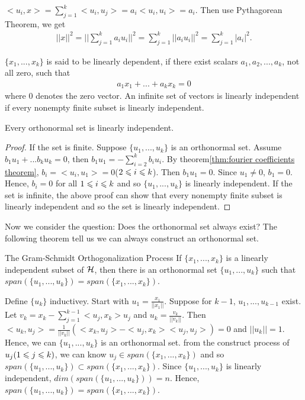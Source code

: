 \begin{proofsolution}
    $<u_i,x>=\sum\limits_{j=1}^{k}<u_i,u_j>=a_i<u_i,u_i>=a_i$. Then use Pythagorean Theorem, we get
    \begin{align*}
        ||x||^2=||\sum\limits_{j=1}^{k} a_iu_i||^2=\sum\limits_{j=1}^{k}||a_iu_i||^2=\sum\limits_{j=1}^{k}|a_i|^2.
    \end{align*}
\end{proofsolution}

\begin{definition}{}{}
    $\{x_1,..., x_k\}$ is said to be linearly dependent, if there exist scalars $a_1,a_2,...,a_k$, not all zero, such that
    \begin{align*}
        a_1x_1+...+a_kx_k=0
    \end{align*}
    where $0$ denotes the zero vector.
    An infinite set of vectors is linearly independent if every nonempty finite subset is linearly independent.
\end{definition}


\begin{corollary}{}{}
    Every orthonormal set is linearly independent.
\end{corollary}
\begin{proof}
    If the set is finite. Suppose $\{u_1,...,u_k\}$ is an orthonormal set. Assume $b_1u_1+...b_ku_k=0$, then $b_1u_1=-\sum\limits_{i=2}^{k}b_iu_i$. 
    By theorem\ref{thm:fourier coefficients theorem}, $b_i=<u_i,u_1>=0$($2\leqslant i\leqslant k$). Then $b_1u_1=0$.
    Since $u_1\neq 0$, $b_1=0$. Hence, $b_i=0$ for all $1\leqslant i\leqslant k$ and so $\{u_1,...,u_k\}$ is linearly independent.
    If the set is infinite, the above proof can show that every nonempty finite subset is linearly independent and so the set is linearly independent.
\end{proof}


Now we consider the question: Does the orthonormal set always exist? The following theorem tell us we can always construct an orthonormal set.

\begin{theorem}{The Gram-Schmidt Orthogonalization Process}{}
    If $\{x_1,...,x_k\}$ is a linearly independent subset of $\mathcal{H}$, 
    then there is an orthonormal set $\{u_1,...,u_k\}$ such that $span(\{u_1,...,u_k\})= span(\{x_1,...,x_k\})$.
\end{theorem}
\begin{proofsolution}
    Define $\{u_k\}$ inductivey. Start with $u_1=\frac{x_1}{||x_1||}$. 
    Suppose for $k-1$, $u_1,...,u_{k-1}$ exist. Let $v_k = x_k-\sum\limits_{j=1}^{k-1}<u_j,x_k>u_j$ and $u_k = \frac{v_k}{||v_k||}$.
    Then $<u_k,u_j>=\frac{1}{||v_k||}(<x_k,u_j>-<u_j,x_k><u_j,u_j>)=0$ and $||u_k||=1$.
    Hence, we can $\{u_1,...,u_k\}$ is an orthonormal set. 
    from the construct process of $u_j(1\leqslant j \leqslant k)$, we can know $u_j\in span(\{x_1,...,x_k\})$ and so $span(\{u_1,...,u_k\})\subset span(\{x_1,...,x_k\})$. 
    Since $\{u_1,...,u_k\}$ is linearly independent, $dim(span(\{u_1,...,u_k\}))=n$. Hence, $span(\{u_1,...,u_k\})= span(\{x_1,...,x_k\})$.
\end{proofsolution}


